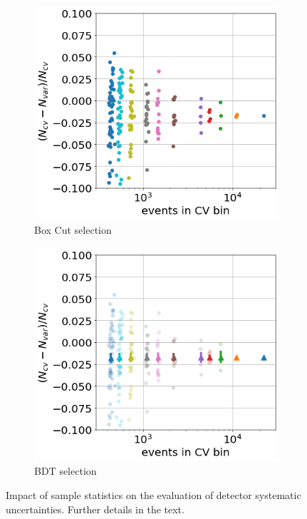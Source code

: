 \begin{figure}[ht] 
\begin{center}
    \begin{subfigure}[b]{0.35\textwidth}
    \centering
    \includegraphics[width=1.00\textwidth]{detsys/detsysstats00.png}
    \caption{Box Cut selection}
    \end{subfigure}
    \begin{subfigure}[b]{0.35\textwidth}
    \centering
    \includegraphics[width=1.00\textwidth]{detsys/detsysstats01.png}
    \caption{BDT selection}
    \end{subfigure}
\caption{\label{fig:detsysstatlimitation} Impact of sample statistics on the evaluation of detector systematic uncertainties. Further details in the text.}
\end{center}
\end{figure}
